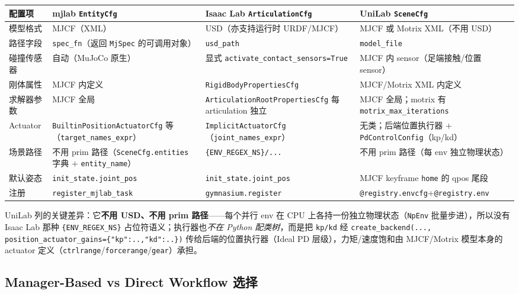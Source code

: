 \begin{center}
\small
\begin{tabular}{@{}lp{3.0cm}p{4.0cm}p{3.6cm}@{}}
\toprule
配置项 & mjlab \texttt{EntityCfg} & Isaac Lab \texttt{ArticulationCfg} & UniLab \texttt{SceneCfg} \\
\midrule
模型格式 & MJCF（XML） & USD（亦支持运行时 URDF/MJCF） & MJCF 或 Motrix XML（不用 USD） \\
路径字段 & \verb|spec_fn|（返回 \verb|MjSpec| 的可调用对象） & \verb|usd_path| & \verb|model_file| \\
碰撞传感器 & 自动（MuJoCo 原生） & 显式 \verb|activate_contact_sensors=True| & MJCF 内 sensor（足端接触/位置 sensor） \\
刚体属性 & MJCF 内定义 & \verb|RigidBodyPropertiesCfg| & MJCF/Motrix XML 内定义 \\
求解器参数 & MJCF 全局 & \verb|ArticulationRootPropertiesCfg| 每 articulation 独立 & MJCF 全局；motrix 有 \verb|motrix_max_iterations| \\
Actuator & \verb|BuiltinPositionActuatorCfg| 等（\verb|target_names_expr|） & \verb|ImplicitActuatorCfg|（\verb|joint_names_expr|） & 无类；后端位置执行器 $+$ \verb|PdControlConfig|（kp/kd） \\
场景路径 & 不用 prim 路径（\verb|SceneCfg.entities| 字典 $+$ \verb|entity_name|） & \verb|{ENV_REGEX_NS}/...| & 不用 prim 路径（每 env 独立物理状态） \\
默认姿态 & \verb|init_state.joint_pos| & \verb|init_state.joint_pos| & MJCF keyframe \verb|home| 的 qpos 尾段 \\
注册 & \verb|register_mjlab_task| & \verb|gymnasium.register| & \verb|@registry.envcfg|+\verb|@registry.env| \\
\bottomrule
\end{tabular}
\end{center}

UniLab 列的关键差异：它\textbf{不用 USD、不用 prim 路径}——每个并行 env 在 CPU 上各持一份独立物理状态（\verb|NpEnv| 批量步进），所以没有 Isaac Lab 那种 \verb|{ENV_REGEX_NS}| 占位符语义；执行器也\emph{不在 Python 配类树}，而是把 \verb|kp/kd| 经 \verb|create_backend(..., position_actuator_gains={"kp":..,"kd":..})| 传给后端的位置执行器（Ideal PD 层级），力矩/速度饱和由 MJCF/Motrix 模型本身的 actuator 定义（\verb|ctrlrange|/\verb|forcerange|/\verb|gear|）承担。

\subsection{Manager-Based vs Direct Workflow 选择}
\label{sec:rlmc-diy-isaac-workflow}

